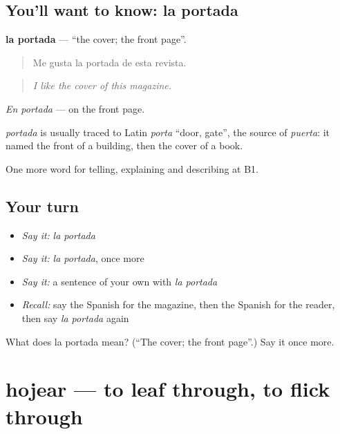 \subsection*{You'll want to know: la portada}
\textbf{la portada} — \textquotedblleft{}the cover; the front page\textquotedblright{}.

\begin{quote}
Me gusta la portada de esta revista.
\end{quote}

\begin{quote}
\emph{I like the cover of this magazine.}
\end{quote}

\emph{En portada} — on the front page.

\begin{cousinweb}
\emph{portada} is usually traced to Latin \emph{porta} \textquotedblleft{}door, gate\textquotedblright{}, the source of \emph{puerta}: it named the front of a building, then the cover of a book.
\end{cousinweb}

\begin{grammarlens}[title={What you've built}]
One more word for telling, explaining and describing at B1.
\end{grammarlens}

\subsection*{Your turn}
\begin{itemize}
\raggedright
  \item \emph{Say it:} \emph{la portada}
  \item \emph{Say it:} \emph{la portada}, once more
  \item \emph{Say it:} a sentence of your own with \emph{la portada}
  \item \emph{Recall:} say the Spanish for the magazine, then the Spanish for the reader, then say \emph{la portada} again
\end{itemize}

\begin{tcolorbox}[breakable,colback=teal!4,colframe=teal!35!black,title={Before you move on}]
What does la portada mean? (\textquotedblleft{}The cover; the front page\textquotedblright{}.) Say it once more.
\end{tcolorbox}
\section[hojear]{hojear — to leaf through, to flick through}

